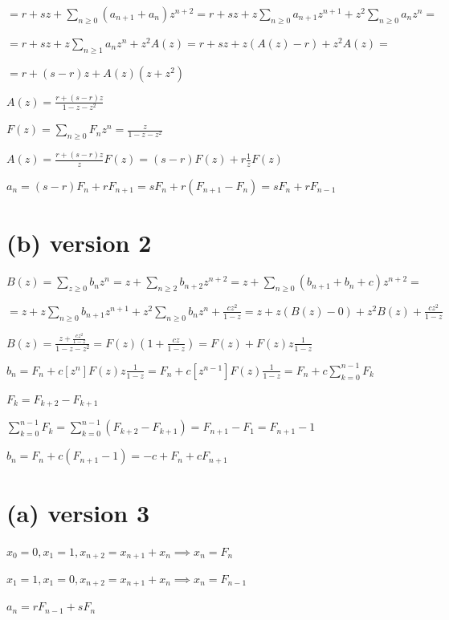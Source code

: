 \documentclass{article}
\begin{document}
\( = r + sz + \sum_{n \geq 0} (a_{n+1} + a_{n}) z^{n+2} = r + sz + z \sum_{n \geq 0} a_{n+1} z^{n+1} + z^{2} \sum_{n \geq 0} a_{n} z^{n} = \)

\( = r + sz + z \sum_{n \geq 1}a_{n} z^{n} + z^{2} A(z) = r + sz + z (A(z)-r) + z^{2} A(z) = \)

\( = r + (s-r)z + A(z)(z+z^{2}) \)

\( A(z) = \frac{r + (s-r)z}{1-z-z^{2}} \)

\( F(z) = \sum_{n \geq 0} F_{n}z^{n} = \frac{z}{1-z-z^{2}} \)

\( A(z) = \frac{r+(s-r)z}{z}F(z) = (s-r)F(z) + r \frac{1}{z}F(z) \)

\( a_{n} = (s-r)F_{n} + r F_{n+1} = s F_{n} + r(F_{n+1} - F_{n}) = s F_{n} + r F_{n-1} \)

\section*{(b) version 2}

\( B(z) = \sum_{z \geq 0} b_{n}z^{n} = z + \sum_{n \geq 2} b_{n+2}z^{n+2} = z + \sum_{n \geq 0} (b_{n+1} + b_{n} + c)z^{n+2} = \)

\( = z + z\sum_{n \geq 0} b_{n+1}z^{n+1} + z^{2} \sum_{n\geq 0}b_{n}z^{n} + \frac{cz^{2}}{1-z} = z + z(B(z) - 0) + z^{2} B(z) + \frac{cz^{2}}{1-z} \)

\( B(z) = \frac{z + \frac{cz^{2}}{1-z}}{1-z-z^{2}} = F(z)(1 + \frac{cz}{1-z}) = F(z) + F(z) z\frac{1}{1-z} \)

\( b_{n} = F_{n} + c[z^{n}]F(z)z\frac{1}{1-z} = F_{n} + c[z^{n-1}]F(z)\frac{1}{1-z} = F_{n} + c\sum_{k=0}^{n-1}F_{k} \)

\( F_{k} = F_{k+2} - F_{k+1} \)

\( \sum_{k=0}^{n-1}F_{k} = \sum_{k=0}^{n-1}(F_{k+2} - F_{k+1}) = F_{n+1} - F_{1} = F_{n+1} - 1 \)

\( b_{n} = F_{n} + c(F_{n+1} - 1) = -c + F_{n} + cF_{n+1} \)

\section*{(a) version 3}

\( x_{0} = 0, x_{1} = 1, x_{n+2} = x_{n+1} + x_{n} \implies x_{n} = F_{n} \)

\( x_{1} = 1, x_{1} = 0, x_{n+2} = x_{n+1} + x_{n} \implies x_{n} = F_{n-1} \)

\( a_{n} = rF_{n-1} + sF_{n} \)
\end{document}
